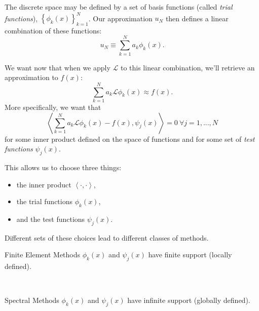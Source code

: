 \documentclass{beamer}
\newcommand{\set}[1]{\left \{ #1 \right \}}
\newcommand{\inner}[2]{\left \langle #1, #2 \right \rangle}
\begin{document}
\begin{frame}

The discrete space may be defined by a set of basis functions (called \textit{trial functions}), $\set{\phi_k(x)}_{k=1}^N$.
Our approximation $u_N$ then defines a linear combination of these functions:
\begin{equation*}
u_N \equiv \sum_{k=1}^N a_k \phi_k(x) .
\end{equation*}

\end{frame}

\begin{frame}

We want now that when we apply $\mathcal{L}$ to this linear combination, we'll retrieve an approximation to $f(x)$:
\begin{equation*}
\sum_{k=1}^N a_k \mathcal{L} \phi_k(x) \approx f(x) .
\end{equation*}
More specifically, we want that
\begin{equation*}
\inner{\sum_{k=1}^N a_k \mathcal{L} \phi_k(x) - f(x) }{\psi_j(x) } = 0 \ \forall j=1,...,N
\end{equation*}
for some inner product defined on the space of functions and for some set of \textit{test functions} $\psi_j(x)$.

\end{frame}

\begin{frame}
This allows us to choose three things:
\begin{itemize}
\item the inner product $\inner{\cdot}{\cdot}$,
\item the trial functions $\phi_k(x)$,
\item and the test functions $\psi_j(x)$.
\end{itemize}

Different sets of these choices lead to different classes of methods.
\end{frame}

\begin{frame}

\begin{block}{Finite Element Methods}
$\phi_k(x)$ and $\psi_j(x)$ have finite support (locally defined).
\end{block}
~
\begin{block}{Spectral Methods}
$\phi_k(x)$ and $\psi_j(x)$ have infinite support (globally defined).
\end{block}
\end{frame}
\end{document}

